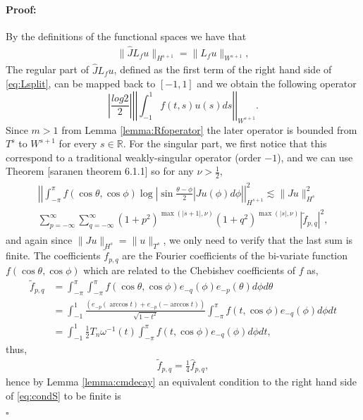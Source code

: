\documentclass{article}
\newenvironment{proof}{\paragraph{Proof:}}{\hfill$\square$}
\newcommand{\todo}[1]{{\color{red}[#1]}}
\newcommand{\IR}{{\mathbb R}}
\begin{document}
\begin{proof}
By the definitions of the functional spaces we have that 
\begin{align*}
\| \widehat{J} L_f u \|_{H^{s+1}} = \|L_f u  \|_{W^{s+1}},
\end{align*}
The regular part of $\widehat{J} L_f u$, defined as the first term of the right hand side of \eqref{eq:Lsplit}, can be mapped back to $[-1,1]$ and we obtain the following operator
$$
\left\vert \frac{log{2}}{2}
\right\vert  
\left\vert \left \vert
 \int_{-1}^{1} f(t , s) u(s) ds 
 \right\vert\right\vert_{W^{s+1}}.
$$
Since $m>1$ from Lemma \ref{lemma:Rfoperator} the later operator is bounded  from $T^s$ to $W^{s+1}$ for every $s \in \IR$. For the singular part, we first notice that this correspond to a traditional weakly-singular operator (order $-1$), and we  can use Theorem \todo{saranen theorem 6.1.1} so for any $\nu >\frac{1}{2}$,
\begin{align}
\label{eq:condS}
\begin{split}
\left\vert \left\vert \int_{-\pi}^{\pi} f(\cos \theta, \cos \phi) \log \left\vert \sin \frac{\theta-\phi}{2} \right\vert Ju(\phi) d\phi  \right\vert \right\vert_{H^{s+1}}^2\lesssim  \|J u\|_{H^s}^2\\
\sum_{p=-\infty}^{\infty} \sum_{q = -\infty}^\infty (1+p^2)^{\max(|s+1|,\nu)}(1+q^2)^{\max(|s|,\nu)} | \widetilde{f}_{p,q}|^2,
\end{split}
\end{align}
and again since $\|Ju\|_{H^s} = \|u \|_{T^s}$, we only need to verify that the last sum is finite. The coefficients $\widetilde{f}_{p,q}$ are the Fourier coefficients of the bi-variate function $f(\cos \theta, \cos \phi)$ which are related to the Chebishev coefficients of $f$ as, 
\begin{align*}
\widetilde{f}_{p,q} &= \int_{-\pi}^\pi \int_{-\pi} ^\pi f(\cos \theta, \cos \phi)  e_{-q}(\phi) e_{-p}(\theta) d\phi d\theta\\
&= \int_{-1}^{1} \frac{(e_{-p}(\arccos t)+e_{-p}(-\arccos t))}{\sqrt{1-t^2}} \int_{-\pi} ^\pi f(t, \cos \phi)  e_{-q}(\phi) d\phi dt \\
&= \int_{-1}^{1} \frac{1}{2}T_n\omega^{-1}(t) \int_{-\pi} ^\pi f(t, \cos \phi)  e_{-q}(\phi) d\phi dt,
\end{align*}
thus, 
\begin{align}
\label{eq:Fouerier2Cheb}
\widetilde{f}_{p,q} = \frac{1}{4} \widehat{f}_{p,q},
\end{align}
 hence by Lemma \ref{lemma:cmdecay} an equivalent condition to the right hand side of \eqref{eq:condS} to be finite is   

\end{proof}
\end{document}
